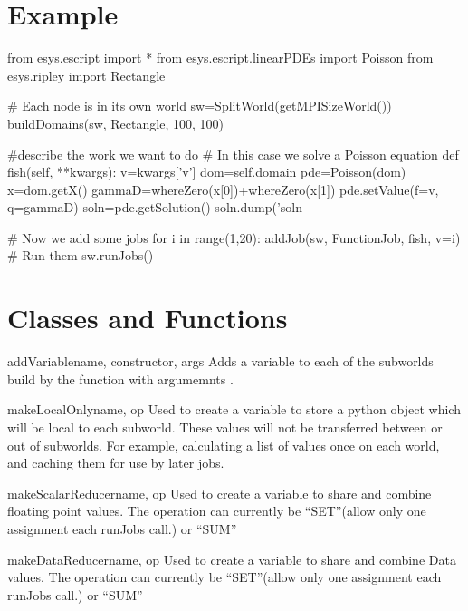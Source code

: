 \section{Example}
\begin{python}
from esys.escript import *
from esys.escript.linearPDEs import Poisson
from esys.ripley import Rectangle 

# Each node is in its own world
sw=SplitWorld(getMPISizeWorld())
buildDomains(sw, Rectangle, 100, 100)

#describe the work we want to do
# In this case we solve a Poisson equation
def fish(self, **kwargs):
    v=kwargs['v']
    dom=self.domain
    pde=Poisson(dom)
    x=dom.getX()
    gammaD=whereZero(x[0])+whereZero(x[1])
    pde.setValue(f=v, q=gammaD)
    soln=pde.getSolution()
    soln.dump('soln%

# Now we add some jobs
for i in range(1,20):
    addJob(sw, FunctionJob, fish, v=i)
# Run them
sw.runJobs() 
\end{python}

\section{Classes and Functions}



\begin{funcdesc}{addVariable}{name, constructor, args}
Adds a variable to each of the subworlds build by the function  with argumemnts . 
\end{funcdesc}

\begin{funcdesc}{makeLocalOnly}{name, op}
Used to create a variable to store a python object which will be local to each subworld.
These values will not be transferred between or out of subworlds.
For example, calculating a list of values once on each world, and caching them for use by later jobs.
\end{funcdesc}

\begin{funcdesc}{makeScalarReducer}{name, op}
Used to create a variable to share and combine floating point values.
The operation can currently be ``SET''(allow only one assignment each runJobs call.) or ``SUM''
\end{funcdesc}

\begin{funcdesc}{makeDataReducer}{name, op}
Used to create a variable to share and combine Data values.
The operation can currently be ``SET''(allow only one assignment each runJobs call.) or ``SUM''
\end{funcdesc}


